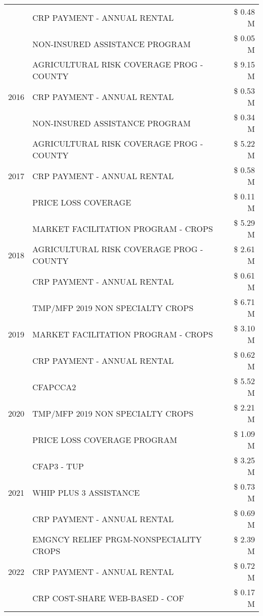 \begin{tabular}{llr}
 & CRP PAYMENT - ANNUAL RENTAL & \$ 0.48 M \\
 & NON-INSURED ASSISTANCE PROGRAM & \$ 0.05 M \\
\cline{1-3}
\multirow[t]{3}{*}{2016} & AGRICULTURAL RISK COVERAGE PROG - COUNTY & \$ 9.15 M \\
 & CRP PAYMENT - ANNUAL RENTAL & \$ 0.53 M \\
 & NON-INSURED ASSISTANCE PROGRAM & \$ 0.34 M \\
\cline{1-3}
\multirow[t]{3}{*}{2017} & AGRICULTURAL RISK COVERAGE PROG - COUNTY & \$ 5.22 M \\
 & CRP PAYMENT - ANNUAL RENTAL & \$ 0.58 M \\
 & PRICE LOSS COVERAGE & \$ 0.11 M \\
\cline{1-3}
\multirow[t]{3}{*}{2018} & MARKET FACILITATION PROGRAM - CROPS & \$ 5.29 M \\
 & AGRICULTURAL RISK COVERAGE PROG - COUNTY & \$ 2.61 M \\
 & CRP PAYMENT - ANNUAL RENTAL & \$ 0.61 M \\
\cline{1-3}
\multirow[t]{3}{*}{2019} & TMP/MFP 2019 NON SPECIALTY CROPS & \$ 6.71 M \\
 & MARKET FACILITATION PROGRAM - CROPS & \$ 3.10 M \\
 & CRP PAYMENT - ANNUAL RENTAL & \$ 0.62 M \\
\cline{1-3}
\multirow[t]{3}{*}{2020} & CFAPCCA2 & \$ 5.52 M \\
 & TMP/MFP 2019 NON SPECIALTY CROPS & \$ 2.21 M \\
 & PRICE LOSS COVERAGE PROGRAM & \$ 1.09 M \\
\cline{1-3}
\multirow[t]{3}{*}{2021} & CFAP3 - TUP & \$ 3.25 M \\
 & WHIP PLUS 3 ASSISTANCE & \$ 0.73 M \\
 & CRP PAYMENT - ANNUAL RENTAL & \$ 0.69 M \\
\cline{1-3}
\multirow[t]{3}{*}{2022} & EMGNCY RELIEF PRGM-NONSPECIALITY CROPS & \$ 2.39 M \\
 & CRP PAYMENT - ANNUAL RENTAL & \$ 0.72 M \\
 & CRP COST-SHARE WEB-BASED - COF & \$ 0.17 M \\
\cline{1-3}
\bottomrule
\end{tabular}
